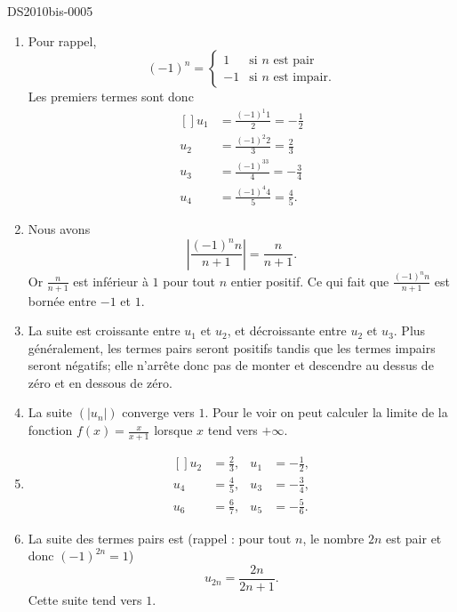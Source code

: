 
\begin{corrige}{DS2010bis-0005}


	\begin{enumerate}
		\item
			Pour rappel, 
			\begin{equation}
				(-1)^n=\begin{cases}
                    1	&	\text{si }n \text{ est pair}\\
                    -1	&	 \text{si }n \text{ est impair.}
				\end{cases}
			\end{equation}
			Les premiers termes sont donc
			\begin{equation}
				\begin{aligned}[]
					u_1&=\frac{(-1)^1 1 }{2}=-\frac{ 1 }{2}\\
					u_2&=\frac{(-1)^2 2 }{3}=\frac{ 2 }{ 3 }\\
					u_3&=\frac{(-1)^33}{ 4 }=-\frac{ 3 }{ 4 }\\
					u_4&=\frac{(-1)^4 4}{ 5 }=\frac{ 4 }{ 5 }.
				\end{aligned}
			\end{equation}
		\item
			Nous avons
			\begin{equation}
				\left| \frac{(-1)^nn}{ n+1 } \right|=\frac{n}{ n+1 }.
			\end{equation}
			Or $\frac{n}{ n+1 }$ est inférieur à $1$ pour tout $n$ entier positif. Ce qui fait que $\frac{(-1)^nn}{ n+1 }$ est bornée entre $-1$ et $1$. 
		\item
			La suite est croissante entre $u_1$ et $u_2$, et décroissante entre $u_2$ et $u_3$. Plus généralement, les termes pairs seront positifs tandis que les termes impairs seront négatifs; elle n'arrête donc pas de monter et descendre au dessus de zéro et en dessous de zéro.
		\item
			La suite $(| u_n |)$ converge vers $1$. Pour le voir on peut calculer la limite de la fonction $f(x)=\frac{x}{ x+1 }$ lorsque $x$ tend vers $+\infty$.  
		\item
			\begin{equation}
				\begin{aligned}[]
					u_2&=\frac{ 2 }{3},	&u_1&=-\frac{1}{2},\\
					u_4&=\frac{ 4 }{5},	&u_3&=-\frac{ 3 }{ 4 },\\
					u_6&=\frac{ 6 }{7},	&u_5&=-\frac{ 5 }{ 6 }.
				\end{aligned}
			\end{equation}
		\item
			La suite des termes pairs est (rappel : pour tout $n$, le nombre $2n$ est pair et donc $(-1)^{2n}=1$)
			\begin{equation}
				u_{2n}=\frac{2n}{ 2n+1 }.
			\end{equation}
			Cette suite tend vers $1$.


\end{enumerate}
\end{corrige}
